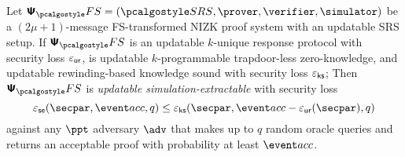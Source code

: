 
\begin{theorem}
	\label{thm:se}
	Let $\psfs = (\SRScer, \prover, \verifier, \simulator)$ be a  $(2\mu + 1)$-message FS-transformed NIZK proof system with an updatable SRS setup. If $\psfs$ is an
	updatable $k$-unique response protocol with security loss $\varepsilon_{\mathsf{ur}}$, is
	updatable $k$-programmable trapdoor-less zero-knowledge, and %
	updatable rewinding-based knowledge sound with security loss $\varepsilon_{\mathsf{ks}}$; 
	Then $\psfs$ is \emph{updatable simulation-extractable} with security loss $$\epsse(\secpar,\accProb,q) \leq \epscss(\secpar,\accProb - \epsur(\secpar),q)$$ against any $\ppt$ adversary $\advse$ that makes up to $q$ random oracle queries and returns an acceptable proof with probability at least $\accProb$.
\end{theorem}

